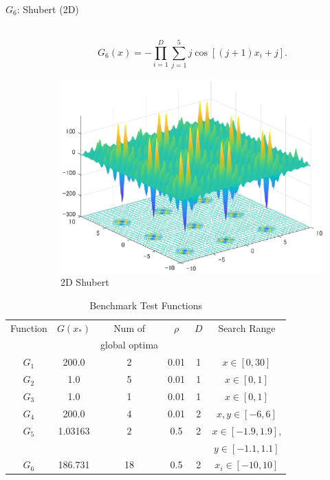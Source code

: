 \documentclass[a4j,11pt]{jarticle}
\begin{document}
\begin{description}
\item[$G_6$: Shubert (2D)]\mbox{}\\
\begin{equation}
\label{eq:maxF6}
G_6(x)=-\prod_{i=1}^D \sum_{j=1}^5 j\cos[(j+1)x_i+j].
\end{equation}
\begin{figure}[h]
\centering
\includegraphics[width=0.8\linewidth]{eps/F6.eps}
\caption{2D Shubert}
\label{fig:maxF6}
\end{figure}

\end{description}

\begin{table}[h]
\caption{Benchmark Test Functions}
\begin{center}
\begin{tabular}{c|c|c|c|c|c}
\hline

Function & $G(x_*)$ & Num of & $\rho$ & $D$ & Search Range \\
& & global optima & & & \\
\hline
$G_1$ & 200.0 & 2 & 0.01 & 1 & $x \in [0,30]$  \\
\hline
$G_2$ & 1.0 & 5 & 0.01 & 1 & $x \in [0,1]$  \\
\hline
$G_3$ & 1.0 & 1 & 0.01 & 1 & $x \in [0,1]$  \\
\hline
$G_4$ & 200.0 & 4 & 0.01 & 2 & $x,y \in [-6,6]$  \\
\hline
$G_5$ & 1.03163 & 2 & 0.5 & 2 & $x \in [-1.9,1.9]$, \\
& & & & & $y \in [-1.1,1.1]$ \\
\hline
$G_6$ & 186.731 & 18 & 0.5 & 2 & $x_i \in [-10,10]$  \\
\hline
\end{tabular}
\label{tab:maxMOP}
\end{center}
\end{table}
\end{document}
